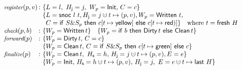 \[
\begin{array}{l@{\, :\ } l}
 \aux{register}(p,v) &
  \!\!\! \begin{array}[t]{l}
   \{\ordlist = l,\ \histJ = j,\ \wpp = \mathsf{Init},\, \C = c\}\\ 
   \{\ordlist = \mathsf{snoc}\ l\ t, \histJ = j \hunion t \hpts (p,v), \wpp = \mathsf{Written}\ t,\\
   \phantom{\{} C = \mathsf{if}\ \s \& \spp\ \mathsf{then}\ c[t
                                       \mapsto \mathsf{yellow}]\
                                       \mathsf{else}\ c[t \mapsto \mathsf{red})]\}\quad\mbox{where $t = \mathsf{fresh}\ \hist$}
  \end{array} \\[3pt]
 \aux{check}(p,b) & \{\wpp = \mathsf{Written}\, t\}\quad
  \{\wpp = \mathsf{if}\ b\
  \mathsf{then}\ \mathsf{Dirty}\, t\ \mathsf{else}\ \mathsf{Clean}\, t\}\\
  \aux{forward}(p) &
  \!\!\! \begin{array}[t]{l}
   \{\wpp = \mathsf{Dirty}\, t,\, \C = c \}\\ 
   \{\wpp = \mathsf{Clean}\, t,\, %
   \C= \mathsf{if}\ \s \& \spp\ \mathsf{then}\ c[t \mapsto \mathsf{green}]\ \mathsf{else}\ c\}
  \end{array}\\
  \aux{finalize}(p) &
  \!\!\! \begin{array}[t]{l}
  \{\wpp = \mathsf{Clean}\, t,\ \histS = h,\, %
  \histJ = j \hunion t \hpts (p,v), E = e \}\\
  \{\wpp = \mathsf{Init},\, \histS = h \hunion t \hpts (p,v),\, %
     \histJ = j,\ E = e \hunion t \hpts \mathsf{last}\ \hist \}
 \end{array}
\end{array}
\]
%

